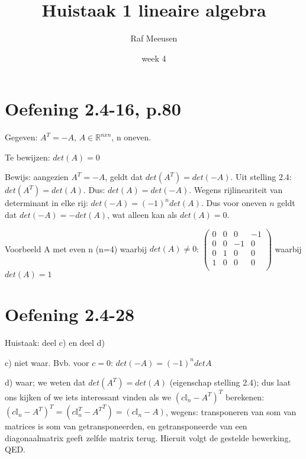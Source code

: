 \documentclass{article}
\title{Huistaak 1 lineaire algebra}
\author{Raf Meeusen}
\date{week 4}
\begin{document}
\maketitle

\section{Oefening 2.4-16, p.80}

Gegeven: $A^T=-A$, $A \in \mathbb{R}^{nxn}$, n oneven. 

Te bewijzen: $det(A) = 0$

Bewijs: aangezien $A^T=-A$, geldt dat $det(A^T)=det(-A)$. Uit stelling 2.4: $det(A^T)=det(A)$. 
Dus: $det(A)=det(-A)$. Wegens rijlineariteit van determinant in elke rij: $det(-A) = (-1)^ndet(A)$. 
Dus voor oneven $n$ geldt dat $det(-A) = -det(A)$, wat alleen kan als $det(A)=0$. 

Voorbeeld A met even n (n=4) waarbij $det(A) \neq 0$: 
\begin{math}
\begin{pmatrix}
0 & 0 & 0 & -1 \\
0 & 0 & -1 & 0 \\
0 & 1 & 0 & 0 \\
1 & 0 & 0 & 0 \\
\end{pmatrix}
\end{math}
waarbij $det(A) = 1 $

\section{Oefening 2.4-28}

Huistaak: deel c) en deel d) 
 
c) niet waar. Bvb. voor $c=0$: $det(-A) = (-1)^n detA$

d) waar; we weten dat $det(A^T) = det(A)$ (eigenschap stelling 2.4); dus laat ons kijken of we iets interessant vinden als we $(c\mathbb{I}_n - A^T)^T$ berekenen: $(c\mathbb{I}_n - A^T)^T = (c\mathbb{I}_n^T - {A^T}^T) = (c\mathbb{I}_n - A)$, wegens: transponeren van som van matrices is som van getransponeerden, en getransponeerde van een diagonaalmatrix geeft zelfde matrix terug. Hieruit volgt de gestelde bewerking, QED.  
\end{document}
